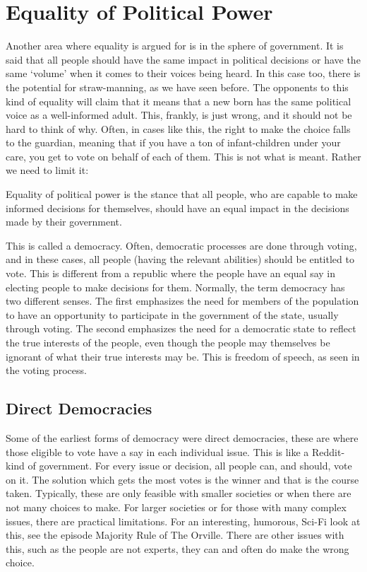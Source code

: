 \section{Equality of Political Power}

Another area where equality is argued for is in the sphere of government. It is said that all people should have the same impact in political decisions or have the same ‘volume’ when it comes to their voices being heard. In this case too, there is the potential for straw-manning, as we have seen before. The opponents to this kind of equality will claim that it means that a new born has the same political voice as a well-informed adult. This, frankly, is just wrong, and it should not be hard to think of why. Often, in cases like this, the right to make the choice falls to the guardian, meaning that if you have a ton of infant-children under your care, you get to vote on behalf of each of them. This is not what is meant. Rather we need to limit it:
\begin{center}
Equality of political power is the stance that all people, who are capable to make informed decisions for themselves, should have an equal impact in the decisions made by their government.
\end{center}
This is called a democracy. Often, democratic processes are done through voting, and in these cases, all people (having the relevant abilities) should be entitled to vote. This is different from a republic where the people have an equal say in electing people to make decisions for them.  Normally, the term democracy has two different senses. The first emphasizes the need for members of the population to have an opportunity to participate in the government of the state, usually through voting. The second emphasizes the need for a democratic state to reflect the true interests of the people, even though the people may themselves be ignorant of what their true interests may be. This is freedom of speech, as seen in the voting process.
\subsection{Direct Democracies}

Some of the earliest forms of democracy were direct democracies, these are where those eligible to vote have a say in each individual issue. This is like a Reddit-kind of government. For every issue or decision, all people can, and should, vote on it. The solution which gets the most votes is the winner and that is the course taken. Typically, these are only feasible with smaller societies or when there are not many choices to make. For larger societies or for those with many complex issues, there are practical limitations. For an interesting, humorous, Sci-Fi look at this, see the episode Majority Rule of The Orville. There are other issues with this, such as the people are not experts, they can and often do make the wrong choice.

